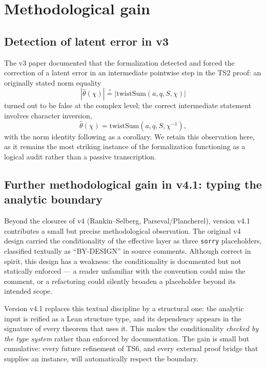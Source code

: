 \documentclass[11pt,a4paper]{article}
\theoremstyle{definition}
\begin{document}
\section{Methodological gain}\label{sec:gain}

\subsection{Detection of latent error in v3}

The v3 paper documented that the formalization detected and forced the correction of a latent error in an intermediate pointwise step in the TS2 proof: an originally stated norm equality
\[
  |\widehat{\theta}(\chi)| \stackrel{?}{=} |\mathrm{twistSum}(a, q, S, \chi)|
\]
turned out to be false at the complex level; the correct intermediate statement involves character inversion,
\[
  \widehat{\theta}(\chi) = \mathrm{twistSum}(a, q, S, \chi^{-1}),
\]
with the norm identity following as a corollary. We retain this observation here, as it remains the most striking instance of the formalization functioning as a logical audit rather than a passive transcription.

\subsection{Further methodological gain in v4.1: typing the analytic boundary}

Beyond the closures of v4 (Rankin--Selberg, Parseval/Plancherel), version v4.1 contributes a small but precise methodological observation. The original v4 design carried the conditionality of the effective layer as three \texttt{sorry} placeholders, classified textually as ``BY-DESIGN'' in source comments. Although correct in spirit, this design has a weakness: the conditionality is documented but not statically enforced --- a reader unfamiliar with the convention could miss the comment, or a refactoring could silently broaden a placeholder beyond its intended scope.

Version v4.1 replaces this textual discipline by a structural one: the analytic input is reified as a Lean structure type, and its dependency appears in the signature of every theorem that uses it. This makes the conditionality \emph{checked by the type system} rather than enforced by documentation. The gain is small but cumulative: every future refinement of TS6, and every external proof bridge that supplies an instance, will automatically respect the boundary.
\end{document}
